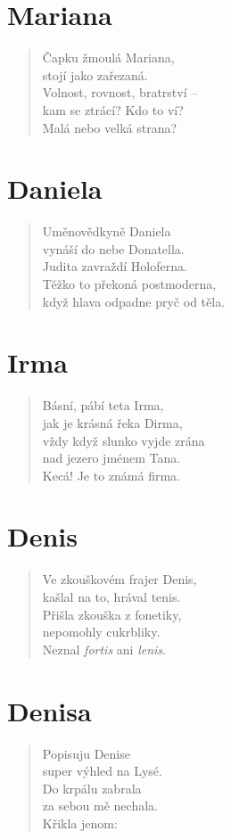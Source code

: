 \section*{Mariana}
\begin{verse}
Čapku žmoulá Mariana,\\
stojí jako zařezaná.\\
Volnost, rovnost, bratrství --\\
kam se ztrácí? Kdo to ví?\\
Malá nebo velká strana?
\end{verse}

\section*{Daniela}
\begin{verse}
Uměnovědkyně Daniela\\
vynáší do nebe Donatella.\\
Judita zavraždí Holoferna.\\
Těžko to překoná postmoderna,\\
když hlava odpadne pryč od těla.
\end{verse}

\section*{Irma}
\begin{verse}
Básní, pábí teta Irma,\\
jak je krásná řeka Dirma,\\
vždy když slunko vyjde zrána\\
nad jezero jménem Tana.\\
Kecá! Je to známá firma.
\end{verse}

\section*{Denis}
\begin{verse}
Ve zkouškovém frajer Denis,\\
kašlal na to, hrával tenis.\\
Přišla zkouška z fonetiky,\\
nepomohly cukrbliky.\\
Neznal \textit{fortis} ani \textit{lenis}.
\end{verse}

\section*{Denisa}
\begin{verse}
Popisuju Denise\\
super výhled na Lysé.\\
Do krpálu zabrala\\
za sebou mě nechala.\\
Křikla jenom: 
\end{verse}

